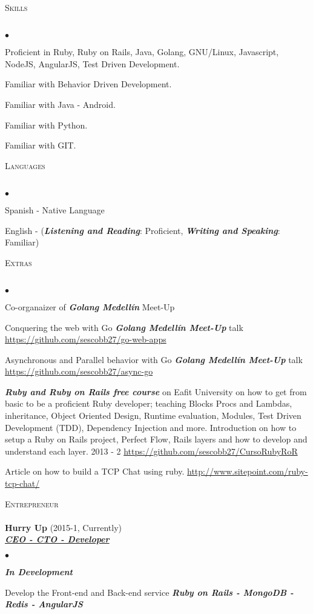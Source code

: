 \documentclass[a4paper]{article}
\newcommand{\lineunder}{\vspace*{-8pt} \\ \hspace*{-18pt} \hrulefill \\}
\newcommand{\header}[1]{{\hspace*{-15pt}\vspace*{6pt}
\textsc{#1}} \vspace*{-6pt} \lineunder}
\newcommand{\employer}[3]{{
\textbf{#1} (#2)\\ \underline{\textbf{\emph{#3}}}\\ }}
\newenvironment{achievements}{\begin{list}{$\bullet$}{\topsep 0pt \itemsep
-2pt}}{\vspace*{4pt}\end{list}}
\newcommand{\emphasys}[1]{\textbf{\emph{#1}}}
\begin{document}
\header{Skills}
\begin{achievements}
\item {Proficient in Ruby, Ruby on Rails, Java, Golang, GNU/Linux, Javascript, NodeJS, AngularJS, Test Driven Development.}
\item {Familiar with Behavior Driven Development.}
\item {Familiar with Java - Android.}
\item {Familiar with Python.}
\item {Familiar with GIT.}
\end{achievements}
\header{Languages}
\begin{achievements}
\item{Spanish - Native Language}
\item{English - (\emphasys{Listening and Reading}: Proficient, \emphasys{Writing and Speaking}: Familiar)}
\end{achievements}

\header{Extras}
\begin{achievements}
\item{Co-organaizer of \emphasys{Golang Medell\'in} Meet-Up}
\item{Conquering the web with Go \emphasys{Golang Medell\'in Meet-Up} talk \url{https://github.com/sescobb27/go-web-apps}}
\item{Asynchronous and Parallel behavior with Go \emphasys{Golang Medell\'in Meet-Up} talk \url{https://github.com/sescobb27/async-go}}
\item{\emphasys{Ruby and Ruby on Rails free course} on Eafit University on how to get from basic to be a proficient Ruby developer; teaching Blocks Procs and Lambdas, inheritance, Object Oriented Design, Runtime evaluation, Modules, Test Driven Development (TDD), Dependency Injection and more. Introduction on how to setup a Ruby on Rails project, Perfect Flow, Rails layers and how to develop and understand each layer. 2013 - 2 \url{https://github.com/sescobb27/CursoRubyRoR}}
\item{Article on how to build a TCP Chat using ruby. \url{http://www.sitepoint.com/ruby-tcp-chat/}}
\end{achievements}

\header{Entrepreneur}
\employer{ Hurry Up} {2015-1, Currently} {CEO - CTO - Developer}
\begin{achievements}
\item {\emphasys{In Development}}
\item {Develop the Front-end and Back-end service \emphasys{Ruby on Rails - MongoDB - Redis - AngularJS}}
\end{achievements}
\end{document}
